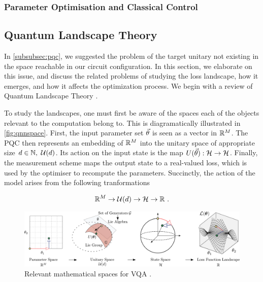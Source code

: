 \subsubsection{Parameter Optimisation and Classical Control}

\subsection{Quantum Landscape Theory}
\label{subsec:quantlandscape}

In \autoref{subsubsec:pqc}, we suggested the problem of the target unitary not
existing in the space reachable in our circuit configuration. In this section,
we elaborate on this issue, and discuss the related problems of studying the
loss landscape, how it emerges, and how it affects the optimization process. We
begin with a review of Quantum Landscape Theory \cite[see][chapter
II.B]{larocca2021theory}.

To study the landscapes, one must first be aware of the spaces each of the
objects relevant to the computation belong to. This is diagramatically
illustrated in \autoref{fig:qnnspace}. First, the input parameter set
\(\vec{\theta}\) is seen as a vector in \(\mathbb{R}^M\). The PQC then represents an
embedding of \(\mathbb{R}^M\) into the unitary space of appropriate size
\(d\in\mathbb{N},~ \mathcal{U}(d)\). Its action on the input state is the map
\(U(\vec{\theta}): \mathcal{H} \to \mathcal{H}\). Finally, the
measurement scheme maps the output state to a real-valued loss, which is used by
the optimiser to recompute the parameters. Succinctly, the action of the model
arises from the following tranformations

\begin{gather}
    \mathbb{R}^M \to \mathcal{U}(d) \to \mathcal{H} \to \mathbb{R}~.
    \label{eq:transformations}
\end{gather}

\begin{figure}[!ht]
    \includegraphics[width=\textwidth]{figures/mapsurjective.pdf}
    \caption{Relevant mathematical spaces for VQA \cite[taken from][Figure 2]{larocca2021theory}.}
    \label{fig:qnnspace}
\end{figure}

